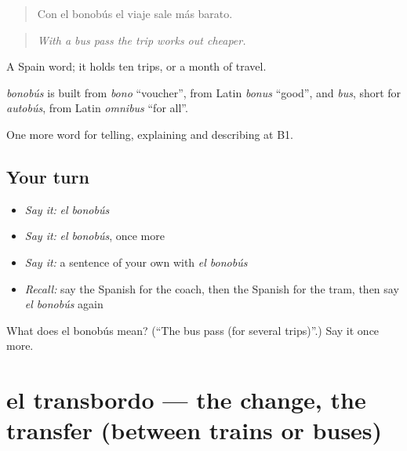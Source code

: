 \begin{quote}
Con el bonobús el viaje sale más barato.
\end{quote}

\begin{quote}
\emph{With a bus pass the trip works out cheaper.}
\end{quote}

A Spain word; it holds ten trips, or a month of travel.

\begin{cousinweb}
\emph{bonobús} is built from \emph{bono} \textquotedblleft{}voucher\textquotedblright{}, from Latin \emph{bonus} \textquotedblleft{}good\textquotedblright{}, and \emph{bus}, short for \emph{autobús}, from Latin \emph{omnibus} \textquotedblleft{}for all\textquotedblright{}.
\end{cousinweb}

\begin{grammarlens}[title={What you've built}]
One more word for telling, explaining and describing at B1.
\end{grammarlens}

\subsection*{Your turn}
\begin{itemize}
\raggedright
  \item \emph{Say it:} \emph{el bonobús}
  \item \emph{Say it:} \emph{el bonobús}, once more
  \item \emph{Say it:} a sentence of your own with \emph{el bonobús}
  \item \emph{Recall:} say the Spanish for the coach, then the Spanish for the tram, then say \emph{el bonobús} again
\end{itemize}

\begin{tcolorbox}[breakable,colback=teal!4,colframe=teal!35!black,title={Before you move on}]
What does el bonobús mean? (\textquotedblleft{}The bus pass (for several trips)\textquotedblright{}.) Say it once more.
\end{tcolorbox}
\section[el transbordo]{el transbordo — the change, the transfer (between trains or buses)}

\label{lesson:ES-C650-transbordo}



